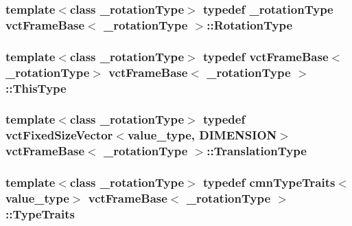 \subsubsection[{Rotation\+Type}]{\setlength{\rightskip}{0pt plus 5cm}template$<$class \+\_\+rotation\+Type$>$ typedef \+\_\+rotation\+Type {\bf vct\+Frame\+Base}$<$ \+\_\+rotation\+Type $>$\+::{\bf Rotation\+Type}}\label{classvct_frame_base_a02e4eaad478400dd1d81e772caf3b01b}
\hypertarget{classvct_frame_base_a076f1fe4fc957faa0d1ff7450d1cb768}{}
\subsubsection[{This\+Type}]{\setlength{\rightskip}{0pt plus 5cm}template$<$class \+\_\+rotation\+Type$>$ typedef {\bf vct\+Frame\+Base}$<$\+\_\+rotation\+Type$>$ {\bf vct\+Frame\+Base}$<$ \+\_\+rotation\+Type $>$\+::{\bf This\+Type}}\label{classvct_frame_base_a076f1fe4fc957faa0d1ff7450d1cb768}
\hypertarget{classvct_frame_base_a4c397a93b65f0c38e75e99ff3a659c23}{}
\subsubsection[{Translation\+Type}]{\setlength{\rightskip}{0pt plus 5cm}template$<$class \+\_\+rotation\+Type$>$ typedef {\bf vct\+Fixed\+Size\+Vector}$<$value\+\_\+type, {\bf D\+I\+M\+E\+N\+S\+I\+O\+N}$>$ {\bf vct\+Frame\+Base}$<$ \+\_\+rotation\+Type $>$\+::{\bf Translation\+Type}}\label{classvct_frame_base_a4c397a93b65f0c38e75e99ff3a659c23}
\hypertarget{classvct_frame_base_adfad078285c2712e6acd80fcbfbf5dec}{}
\subsubsection[{Type\+Traits}]{\setlength{\rightskip}{0pt plus 5cm}template$<$class \+\_\+rotation\+Type$>$ typedef {\bf cmn\+Type\+Traits}$<$value\+\_\+type$>$ {\bf vct\+Frame\+Base}$<$ \+\_\+rotation\+Type $>$\+::{\bf Type\+Traits}}\label{classvct_frame_base_adfad078285c2712e6acd80fcbfbf5dec}


